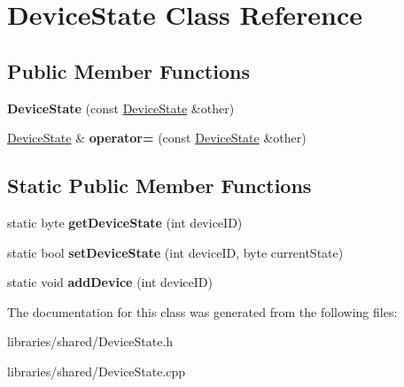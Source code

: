 \hypertarget{class_device_state}{}\section{Device\+State Class Reference}
\label{class_device_state}
\subsection*{Public Member Functions}
\begin{DoxyCompactItemize}
\item 
\mbox{\label{class_device_state_a081f1faacedc150e455f9373660585ca}} 
{\bfseries Device\+State} (const \hyperlink{class_device_state}{Device\+State} \&other)
\item 
\mbox{\label{class_device_state_aa279de87badb0af10375ce339c5cbe16}} 
\hyperlink{class_device_state}{Device\+State} \& {\bfseries operator=} (const \hyperlink{class_device_state}{Device\+State} \&other)
\end{DoxyCompactItemize}
\subsection*{Static Public Member Functions}
\begin{DoxyCompactItemize}
\item 
\mbox{\label{class_device_state_ae1245377c55cd5fde936af873216f0b4}} 
static byte {\bfseries get\+Device\+State} (int device\+ID)
\item 
\mbox{\label{class_device_state_a5026fd2f6396852135f07a5bf9f481cf}} 
static bool {\bfseries set\+Device\+State} (int device\+ID, byte current\+State)
\item 
\mbox{\label{class_device_state_a8179bb50724fb57ec92ebcd075cfc62e}} 
static void {\bfseries add\+Device} (int device\+ID)
\end{DoxyCompactItemize}


The documentation for this class was generated from the following files\+:\begin{DoxyCompactItemize}
\item 
libraries/shared/Device\+State.\+h\item 
libraries/shared/Device\+State.\+cpp\end{DoxyCompactItemize}
